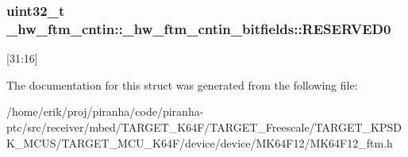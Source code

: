 \subsubsection[{\texorpdfstring{R\+E\+S\+E\+R\+V\+E\+D0}{RESERVED0}}]{\setlength{\rightskip}{0pt plus 5cm}uint32\+\_\+t \+\_\+hw\+\_\+ftm\+\_\+cntin\+::\+\_\+hw\+\_\+ftm\+\_\+cntin\+\_\+bitfields\+::\+R\+E\+S\+E\+R\+V\+E\+D0}\hypertarget{struct__hw__ftm__cntin_1_1__hw__ftm__cntin__bitfields_a6374c61be354b851b7dd09dcded6bf7c}{}\label{struct__hw__ftm__cntin_1_1__hw__ftm__cntin__bitfields_a6374c61be354b851b7dd09dcded6bf7c}
\mbox{[}31\+:16\mbox{]} 

The documentation for this struct was generated from the following file\+:\begin{DoxyCompactItemize}
\item 
/home/erik/proj/piranha/code/piranha-\/ptc/src/receiver/mbed/\+T\+A\+R\+G\+E\+T\+\_\+\+K64\+F/\+T\+A\+R\+G\+E\+T\+\_\+\+Freescale/\+T\+A\+R\+G\+E\+T\+\_\+\+K\+P\+S\+D\+K\+\_\+\+M\+C\+U\+S/\+T\+A\+R\+G\+E\+T\+\_\+\+M\+C\+U\+\_\+\+K64\+F/device/device/\+M\+K64\+F12/M\+K64\+F12\+\_\+ftm.\+h\end{DoxyCompactItemize}
